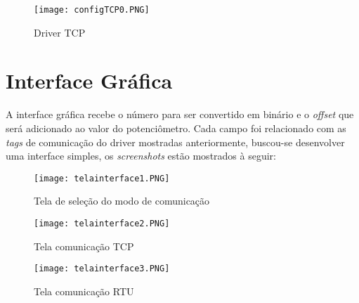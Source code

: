\begin{figure}[H]
	\centering
	\texttt{[image: configTCP0.PNG]}
	\caption{Driver TCP}
	\label{fig:driver_tcp}
\end{figure}
\section{Interface Gráfica}
A interface gráfica recebe o número para ser convertido em binário e o \textit{offset}
 que será adicionado ao valor do potenciômetro. Cada campo foi relacionado com as \textit{tags} de comunicação do driver mostradas anteriormente, buscou-se desenvolver uma interface simples, os \textit{screenshots} estão mostrados à seguir:

\begin{figure}[H]
	\centering
	\texttt{[image: telainterface1.PNG]}
	\caption{Tela de seleção do modo de comunicação}
	\label{fig:tela1}
\end{figure}
\begin{figure}[H]
	\centering
	\texttt{[image: telainterface2.PNG]}
	\caption{Tela comunicação TCP}
	\label{fig:tela_tcp}
\end{figure}
\begin{figure}[H]
	\centering
	\texttt{[image: telainterface3.PNG]}
	\caption{Tela comunicação RTU}
	\label{fig:tela_rtu}
\end{figure}
 

